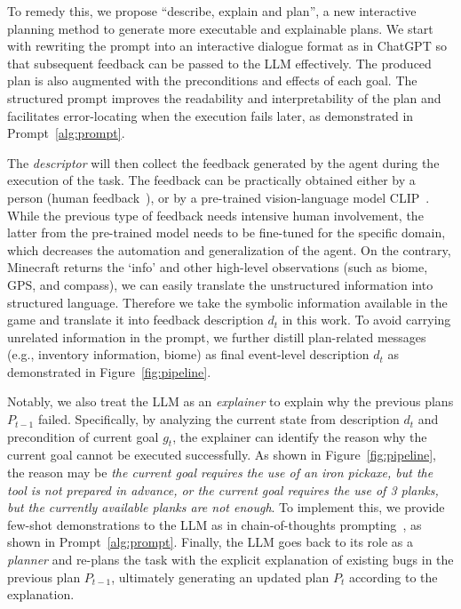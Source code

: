 \documentclass{article}
\begin{document}
To remedy this, we propose ``describe, explain and plan'', a new interactive planning method to generate more executable and explainable plans.
We start with rewriting the prompt into an interactive dialogue format as in ChatGPT \cite{instructGPT} so that subsequent feedback can be passed to the LLM effectively. 
The produced plan is also augmented with the preconditions and effects of each goal.
The structured prompt improves the readability and interpretability of the plan and facilitates error-locating when the execution fails later, as demonstrated in Prompt~\ref{alg:prompt}.

The \textit{descriptor} will then collect the feedback generated by the agent during the execution of the task.
The feedback can be practically obtained either by a person (human feedback~\cite{saycan}), or by a pre-trained vision-language model CLIP~\cite{clip}. 
While the previous type of feedback needs intensive human involvement, the latter from the pre-trained model needs to be fine-tuned for the specific domain, which decreases the automation and generalization of the agent.
On the contrary, Minecraft returns the `info' and other high-level observations (such as biome, GPS, and compass), we can easily translate the unstructured information into structured language. 
Therefore we take the symbolic information available in the game and translate it into feedback description $d_t$ in this work.
To avoid carrying unrelated information in the prompt, we further distill plan-related messages (e.g., inventory information, biome) as final event-level description $d_t$ as demonstrated in Figure~\ref{fig:pipeline}.

Notably, we also treat the LLM as an \textit{explainer} to explain why the previous plans $P_{t-1}$ failed.
Specifically, by analyzing the current state from description $d_t$ and precondition of current goal $g_t$, the explainer can identify the reason why the current goal cannot be executed successfully.
As shown in Figure~\ref{fig:pipeline}, the reason may be \textit{the current goal requires the use of an iron pickaxe, but the tool is not prepared in advance, or the current goal requires the use of 3 planks, but the currently available planks are not enough}. 
To implement this, we provide few-shot demonstrations to the LLM as in chain-of-thoughts prompting~\cite{chainofthought}, as shown in Prompt~\ref{alg:prompt}. 
Finally, the LLM goes back to its role as a \textit{planner} and re-plans the task with the explicit explanation of existing bugs in the previous plan $P_{t-1}$, ultimately generating an updated plan $P_{t}$ according to the explanation.
\end{document}
